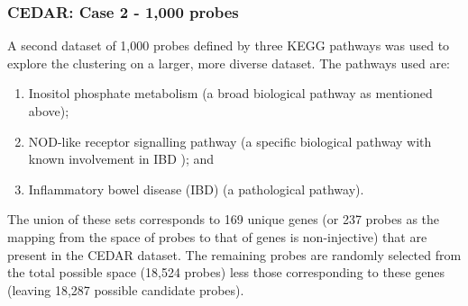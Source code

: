 \documentclass[14pt]{extarticle} %
\begin{document}
	
	\subsubsection{CEDAR: Case 2 - 1,000 probes} \label{sec:case_studies:cedar:dataset_2}
	
	A second dataset of 1,000 probes defined by three KEGG pathways was used to explore the clustering on a larger, more diverse dataset. The pathways used are:
	
	\begin{enumerate} \label{list:kegg_pathways}
		\item Inositol phosphate metabolism (a broad biological pathway as mentioned above);
		\item NOD-like receptor signalling pathway (a specific biological pathway with known involvement in IBD \citep{CarneiroNodlikeproteinsinflammation2008, GarrettHomeostasisInflammationIntestine2010}); and
		\item Inflammatory bowel disease (IBD) (a pathological pathway).
	\end{enumerate}

	The union of these sets corresponds to 169 unique genes (or 237 probes as the mapping from the space of probes to that of genes is non-injective) that are present in the CEDAR dataset. The remaining probes are randomly selected from the total possible space (18,524 probes) less those corresponding to these genes (leaving 18,287 possible candidate probes).
\end{document}
